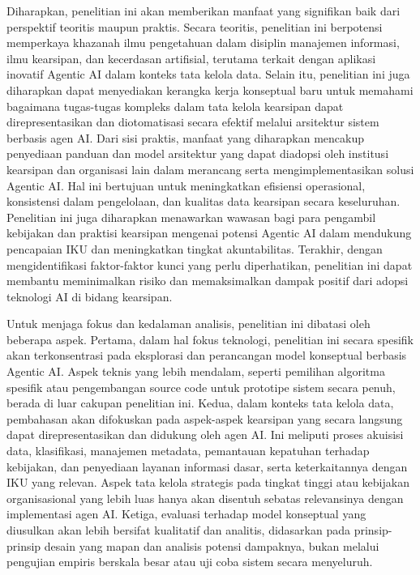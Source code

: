 Diharapkan, penelitian ini akan memberikan manfaat yang signifikan baik
dari perspektif teoritis maupun praktis. Secara teoritis, penelitian ini
berpotensi memperkaya khazanah ilmu pengetahuan dalam disiplin manajemen
informasi, ilmu kearsipan, dan kecerdasan artifisial, terutama terkait
dengan aplikasi inovatif Agentic AI dalam konteks tata kelola data.
Selain itu, penelitian ini juga diharapkan dapat menyediakan kerangka
kerja konseptual baru untuk memahami bagaimana tugas-tugas kompleks
dalam tata kelola kearsipan dapat direpresentasikan dan diotomatisasi
secara efektif melalui arsitektur sistem berbasis agen AI. Dari sisi
praktis, manfaat yang diharapkan mencakup penyediaan panduan dan model
arsitektur yang dapat diadopsi oleh institusi kearsipan dan organisasi
lain dalam merancang serta mengimplementasikan solusi Agentic AI. Hal
ini bertujuan untuk meningkatkan efisiensi operasional, konsistensi
dalam pengelolaan, dan kualitas data kearsipan secara keseluruhan.
Penelitian ini juga diharapkan menawarkan wawasan bagi para pengambil
kebijakan dan praktisi kearsipan mengenai potensi Agentic AI dalam
mendukung pencapaian IKU dan meningkatkan tingkat akuntabilitas.
Terakhir, dengan mengidentifikasi faktor-faktor kunci yang perlu
diperhatikan, penelitian ini dapat membantu meminimalkan risiko dan
memaksimalkan dampak positif dari adopsi teknologi AI di bidang
kearsipan.

Untuk menjaga fokus dan kedalaman analisis, penelitian ini dibatasi oleh
beberapa aspek. Pertama, dalam hal fokus teknologi, penelitian ini
secara spesifik akan terkonsentrasi pada eksplorasi dan perancangan
model konseptual berbasis Agentic AI. Aspek teknis yang lebih mendalam,
seperti pemilihan algoritma spesifik atau pengembangan source code untuk
prototipe sistem secara penuh, berada di luar cakupan penelitian ini.
Kedua, dalam konteks tata kelola data, pembahasan akan difokuskan pada
aspek-aspek kearsipan yang secara langsung dapat direpresentasikan dan
didukung oleh agen AI. Ini meliputi proses akuisisi data, klasifikasi,
manajemen metadata, pemantauan kepatuhan terhadap kebijakan, dan
penyediaan layanan informasi dasar, serta keterkaitannya dengan IKU yang
relevan. Aspek tata kelola strategis pada tingkat tinggi atau kebijakan
organisasional yang lebih luas hanya akan disentuh sebatas relevansinya
dengan implementasi agen AI. Ketiga, evaluasi terhadap model konseptual
yang diusulkan akan lebih bersifat kualitatif dan analitis, didasarkan
pada prinsip-prinsip desain yang mapan dan analisis potensi dampaknya,
bukan melalui pengujian empiris berskala besar atau uji coba sistem
secara menyeluruh.

